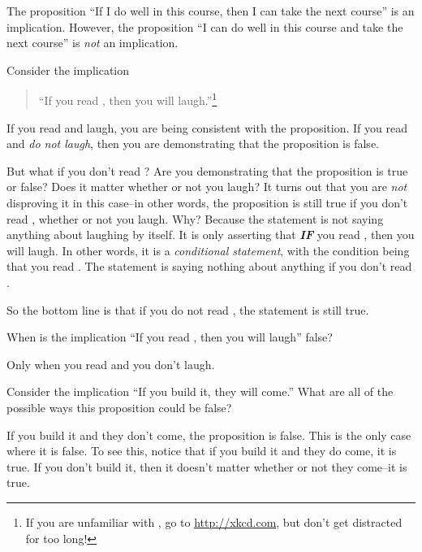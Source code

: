 \begin{exa}
The proposition ``If I do well in this course, then I can take the next course'' is an implication.
However, the proposition ``I can do well in this course and take the next course'' is {\em not} an implication.
\end{exa}

\begin{exa}
Consider the implication 
\begin{quote}
``If you read \xkcd{}, then you will laugh.''\footnote{If you are unfamiliar with \xkcd{}, go to 
\href{http://xkcd.com}{http://xkcd.com}, 
but don't get distracted for too long!}
\end{quote}
If you read \xkcd{} and laugh, you are being consistent with the proposition.
If you read \xkcd{} and {\em do not laugh}, then you are demonstrating that the proposition is false.

But what if you don't read \xkcd{}?  Are you demonstrating that the proposition is true or false?
Does it matter whether or not you laugh?  
It turns out that you are {\em not} disproving it in this case--in other
words, the proposition is still true if you don't read \xkcd{}, whether or not you laugh.  Why?  
Because the statement is not saying anything about laughing by itself. 
It is only asserting that {\bf\em IF} you read \xkcd{}, then you will laugh.
In other words, it is a {\em conditional statement}, with the condition being that 
you read \xkcd{}.  The statement is saying nothing about anything if you don't read \xkcd{}.

So the bottom line is that if you do not read \xkcd{}, the statement is still true.
\end{exa}
\begin{ques}
When is the implication 
``If you read \xkcd{}, then you will laugh'' false?\\
\answerlinetwo
\begin{answer}
Only when you read \xkcd{} and you don't laugh.
\end{answer}
\end{ques}

\begin{exer}
Consider the implication ``If you build it, they will come.''
What are all of the possible ways this proposition could be false?\\
\sollinethree
\begin{answer}
If you build it and they don't come, the proposition is false.  This is the only case where it is false.
To see this, notice that if you build it and they do come, it is true.  If you don't build it, then it
doesn't matter whether or not they come--it is true.
\end{answer}
\end{exer}

